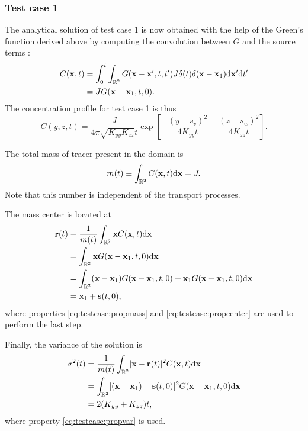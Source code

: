 \subsubsection{Test case 1}
The analytical solution of test case 1 is now obtained with the help of the Green's function derived above by computing the convolution between $G$ and the source terms :
\begin{align}
	C(\b x,t) &= \int_{0}^{t} \int_{\R[2]} G(\b x - \b x',t,t') J \delta(t) \delta(\b x- \b x_1) \rm d \b{x}' \rm dt'\nonumber\\
	&= J G(\b x - \b x_1,t,0).
\end{align}
The concentration profile for test case 1 is thus
\begin{equation}
	C(y,z,t) = \frac{J}{4\pi\sqrt{K_{yy}K_{zz}}t}\exp\left[-\frac{(y-s_v)^2}{4K_{yy}t} -\frac{(z-s_w)^2}{4K_{zz}t} \right].
\end{equation}

The total mass of tracer present in the domain is
\begin{equation}
	m(t) \equiv \int_{\R[2]} C(\b x,t) \rm d \b x = J.
\end{equation}
Note that this number is independent of the transport processes.

The mass center is located at
\begin{align}
	\b r(t) &\equiv \frac{1}{m(t)} \int_{\R[2]} \b x C(\b x,t) \rm d \b x \nonumber \\
	&= \int_{\R[2]} \b x G(\b x - \b x_1,t,0) \rm d \b x \nonumber\\
	&= \int_{\R[2]} (\b x-\b x_1) G(\b x - \b x_1,t,0) + \b x_1 G(\b x - \b x_1,t,0) \rm d \b x\nonumber\\
	&= \b x_1 + \b s(t,0),
\end{align}
where properties \eqref{eq:testcase:propmass} and \eqref{eq:testcase:propcenter} are used to perform the last step.

Finally, the variance of the solution is
\begin{align}
	\sigma^2(t) &= \frac{1}{m(t)} \int_{\R[2]} \lvert \b x - \b r(t) \rvert^2 C(\b x,t) \rm d \b x \nonumber \\
	&= \int_{\R[2]} \lvert (\b x - \b x_1) - \b s(t,0)\rvert^2 G(\b x - \b x_1,t,0) \rm d \b x \nonumber \\
	&= 2(K_{yy}+K_{zz})t,
\end{align}
where property \eqref{eq:testcase:propvar} is used.

